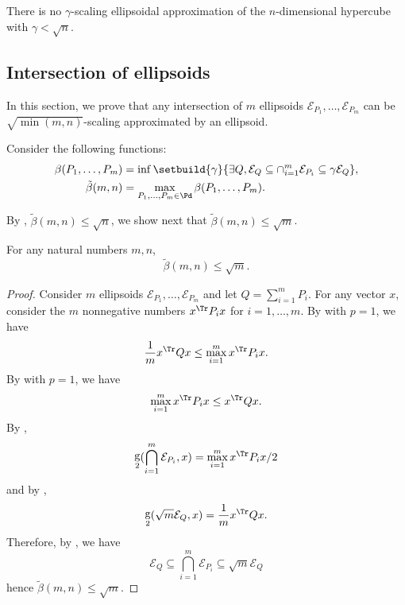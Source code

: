 \documentclass[11pt,twoside,a4paper,openright]{uclouvain-thesis}
\DeclareMathOperator{\gauge}{g}
\newcommand{\johnintm}{\beta}
\newcommand{\johnint}{\tilde{\johnintm}}
\begin{document}
\begin{myprop}
  \label{prop:johnworst}
  There is no $\gamma$-scaling ellipsoidal approximation of the $n$-dimensional hypercube with $\gamma < \sqrt{n}$.
\end{myprop}

\subsection{Intersection of ellipsoids}

In this section, we prove that
any intersection of $m$ ellipsoids $\mathcal{E}_{P_1}, \ldots, \mathcal{E}_{P_m}$
can be $\sqrt{\min(m, n)}$-scaling approximated by an ellipsoid.

Consider the following functions:
\begin{align*}
  \johnintm(P_1, \ldots, P_m) & = \inf \setbuild{\gamma}{\exists Q, \mathcal{E}_Q \subseteq \cap_{i=1}^m \mathcal{E}_{P_i} \subseteq \gamma \mathcal{E}_Q},\\
  \johnint(m, n) & = \max_{P_1, \ldots, P_m \in \Pd} \johnintm(P_1, \ldots, P_m).
\end{align*}

By , $\johnint(m, n) \le \sqrt{n}$, we show
next that $\johnint(m, n) \le \sqrt{m}$.

\begin{mylem}
  For any natural numbers $m, n$,
  \[ \johnint(m, n) \le \sqrt{m}. \]
  \begin{proof}
    Consider $m$ ellipsoids $\mathcal{E}_{P_1}, \ldots, \mathcal{E}_{P_m}$ and
    let $Q = \sum_{i=1}^m P_i$.
    For any vector $x$, consider the $m$ nonnegative numbers $x^\Tr P_i x$ for $i = 1, \ldots, m$.
    By  with $p = 1$, we have
    \[ \frac 1m x^\Tr Q x \le \max_{i=1}^m x^\Tr P_i x. \]
    By  with $p = 1$, we have
    \[ \max_{i=1}^m x^\Tr P_i x \leq x^\Tr Q x. \]
    By ,
    \[ \gauge_2(\bigcap_{i=1}^m \mathcal{E}_{P_i}, x) = \max_{i=1}^m x^\Tr P_i x / 2 \]
    and by ,
    \[ \gauge_2(\sqrt{m} \mathcal{E}_{Q}, x) = \frac 1m x^\Tr Q x. \]
    Therefore, by , we have
    \[ \mathcal{E}_{Q} \subseteq \bigcap_{i=1}^m \mathcal{E}_{P_i} \subseteq \sqrt{m} \mathcal{E}_{Q} \]
    hence \( \johnint(m, n) \leq \sqrt{m}. \)
  \end{proof}
\end{mylem}
\end{document}
